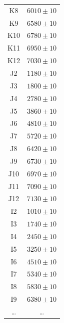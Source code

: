 \documentclass[10pt, twocolumn]{article}
\theoremstyle{definition}
\begin{document}
\begin{table}[h]
\begin{tabular}{cc}
    K8                     & $6010\pm10$                                 \\
    K9                     & $6580\pm10$                                 \\
    K10                    & $6780\pm10$                                 \\
    K11                    & $6950\pm10$                                 \\
    K12                    & $7030\pm10$                                 \\
    J2                     & $1180\pm10$                                 \\
    J3                     & $1800\pm10$                                 \\
    J4                     & $2780\pm10$                                 \\
    J5                     & $3860\pm10$                                 \\
    J6                     & $4810\pm10$                                 \\
    J7                     & $5720\pm10$                                 \\
    J8                     & $6420\pm10$                                 \\
    J9                     & $6730\pm10$                                 \\
    J10                    & $6970\pm10$                                 \\
    J11                    & $7090\pm10$                                 \\
    J12                    & $7130\pm10$                                 \\
    I2                     & $1010\pm10$                                 \\
    I3                     & $1740\pm10$                                 \\
    I4                     & $2450\pm10$                                 \\
    I5                     & $3250\pm10$                                 \\
    I6                     & $4510\pm10$                                 \\
    I7                     & $5340\pm10$                                 \\
    I8                     & $5830\pm10$                                 \\
    I9                     & $6380\pm10$                                 \\
    \dots                  & \dots
  \end{tabular}
  \label{table:cap-measurements}
\end{table}
\clearpage
\end{document}
